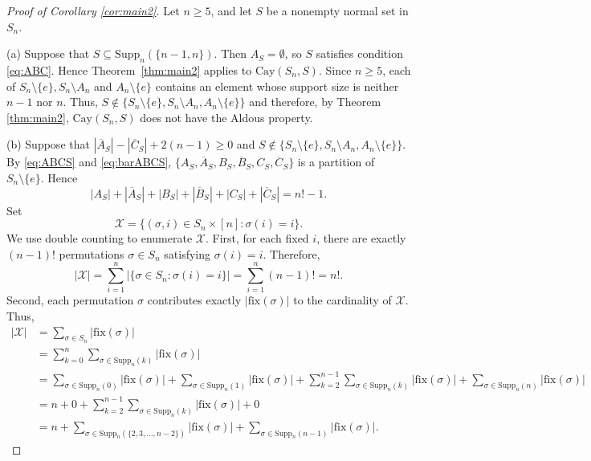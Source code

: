 \documentclass[12pt, a4paper]{article}
\def\fix{\mathrm{fix}}
\theoremstyle{definition}
\begin{document}
\begin{proof}[Proof of Corollary \ref{cor:main2}]
Let $n\ge 5$, and let $S$ be a nonempty normal set in $S_n$.
	
(a) Suppose that $S \subseteq \mathrm{Supp}_n(\{n-1,n\})$. Then $A_S = \emptyset$, so $S$ satisfies condition \eqref{eq:ABC}. Hence Theorem~\ref{thm:main2} applies to $\mathrm{Cay}(S_n,S)$. Since $n\ge 5$, each of $S_n\setminus\{e\}, S_n\setminus A_n$ and $A_n\setminus\{e\}$ contains an element whose support size is neither $n-1$ nor $n$. Thus, $S \notin \{S_n\setminus\{e\}, S_n\setminus A_n, A_n\setminus\{e\}\}$ and therefore, by Theorem \ref{thm:main2}, $\mathrm{Cay}(S_n,S)$ does not have the Aldous property.  

(b) Suppose that $|\overline{A}_S|-|\overline{C}_S|+2(n-1) \ge 0$ and $S \notin \{S_n\setminus\{e\}, S_n\setminus A_n, A_n\setminus\{e\}\}$. By \eqref{eq:ABCS} and \eqref{eq:barABCS}, $\{A_S, \overline{A}_S, B_S, \overline{B}_S, C_S, \overline{C}_S\}$ is a partition of $S_{n} \setminus \{e\}$. Hence
\begin{equation}
\label{sum-set-sn}
|A_S|+|\overline{A}_S|+|B_S|+|\overline{B}_S|+|C_S|+|\overline{C}_S| = n!-1. 
\end{equation}
Set 
$$
\mathcal{X} = \{ (\sigma, i) \in S_n \times [n] : \sigma(i) = i \}.
$$
We use double counting to enumerate $\mathcal{X}$. First, for each fixed $i$, there are exactly $(n-1)!$ permutations $\sigma \in S_n$ satisfying $\sigma(i) = i$. Therefore,
\begin{equation}
\label{eq:fac}
|\mathcal{X}| = \sum_{i=1}^n |\{ \sigma \in S_n : \sigma(i) = i \}| = \sum_{i=1}^n (n-1)! = n!.
\end{equation}
Second, each permutation $\sigma$ contributes exactly $|\fix(\sigma)|$ to the cardinality of $\mathcal{X}$. Thus,
\begin{align*}
	|\mathcal{X}| 
	&= 
	\sum_{\sigma \in S_n} |\fix(\sigma)|  \\
	&= 
	\sum_{k=0}^n \sum_{\sigma \in \mathrm{Supp}_n(k)} |\fix(\sigma)|   \\
	&=
	\sum_{\sigma \in \mathrm{Supp}_n(0)} |\fix(\sigma)|
	+
	\sum_{\sigma \in \mathrm{Supp}_n(1)} |\fix(\sigma)|
	+
	\sum_{k=2}^{n-1} \sum_{\sigma \in \mathrm{Supp}_n(k)} |\fix(\sigma)|
	+
	\sum_{\sigma \in \mathrm{Supp}_n(n)} |\fix(\sigma)|  \\
	&=
	n+0+
	\sum_{k=2}^{n-1} \sum_{\sigma \in \mathrm{Supp}_n(k)} |\fix(\sigma)|
	+0  \\
	&=
	n+\sum_{\sigma \in \mathrm{Supp}_n(\{2, 3, \ldots, n-2\})} |\fix(\sigma)|+\sum_{\sigma \in \mathrm{Supp}_n(n-1)} |\fix(\sigma)|.  

\end{align*}
\end{proof}
\end{document}
